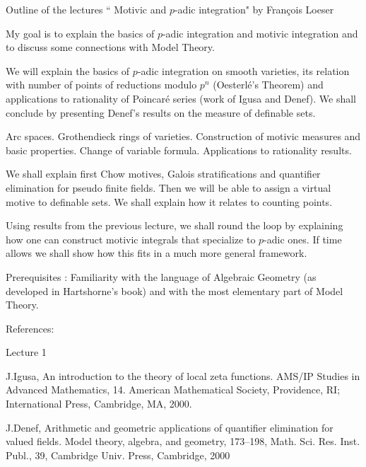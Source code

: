 

Outline of the lectures `` Motivic and $p$-adic integration"
by Fran\c cois Loeser

\bigskip

My goal is to explain the basics of $p$-adic integration
and motivic integration
and to discuss some connections with  Model Theory.

\bigskip
{}
We will explain the basics of  $p$-adic integration on smooth varieties,
its relation with number of points of reductions modulo $p^n$
(Oesterl\' e's Theorem)
and applications to rationality of Poincar\'e series (work of Igusa and Denef).
We shall conclude by presenting Denef's results on the measure
of definable sets.

\bigskip
{}
Arc spaces. Grothendieck
rings of varieties. Construction of
motivic measures and basic properties. Change of variable formula.
Applications to rationality results.


\bigskip
{}
We shall explain first Chow motives, Galois stratifications
and quantifier elimination for pseudo finite fields.
Then we will be able to assign a virtual motive
to definable sets. We shall explain how it relates to counting points.

\bigskip
{}
Using results from the previous lecture, we shall round the loop by
explaining how one can construct
motivic integrals that specialize to $p$-adic ones. If time allows
we shall show how this fits in a much more general framework.


\bigskip


\noindent Prerequisites : Familiarity with the language of Algebraic Geometry (as developed in
Hartshorne's book) and with the most elementary
part of Model Theory.



\bigskip

\noindent References: 

\noindent Lecture 1


\noindent [1] J.Igusa,
An introduction to the theory of local zeta functions.
AMS/IP Studies in Advanced Mathematics, 14.
American Mathematical Society, Providence, RI; International Press, Cambridge, MA, 2000.



\noindent [2] J.Denef,
Arithmetic and geometric applications of quantifier elimination for valued fields.
Model theory, algebra, and geometry, 173--198,
Math. Sci. Res. Inst. Publ., 39, Cambridge Univ. Press, Cambridge, 2000


